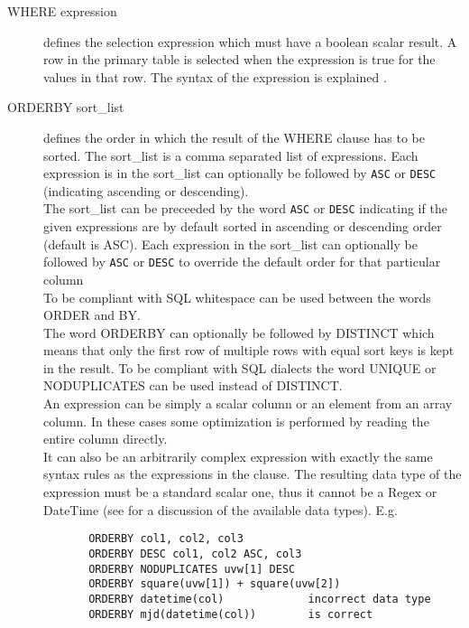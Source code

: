 \begin{description}
  \item[WHERE expression]
       defines the selection expression which must have a boolean
       scalar result. A row in the primary table
       is selected when the expression is true for the values in that row.
       The syntax of the expression is explained
       .
  \item[ \label{TAQL:ORDERBY}ORDERBY sort\_list]
       defines the order in which the result of the WHERE clause
       has to be sorted. The sort\_list is a comma separated list of
       expressions.
       Each expression is in the sort\_list can optionally be
       followed by \texttt{ASC} or \texttt{DESC}
       (indicating ascending or descending).
       \\The sort\_list can be preceeded by the word \texttt{ASC} or
       \texttt{DESC} indicating if the given expressions are by
       default sorted in ascending or descending order (default is ASC).
       Each expression in the sort\_list can optionally be
       followed by \texttt{ASC} or \texttt{DESC} to override the
       default order for that particular column
       \\To be compliant with SQL whitespace can be used between the
       words ORDER and BY.
       \\The word ORDERBY can optionally be followed by DISTINCT
       which means that only the first row of multiple rows with
       equal sort keys is kept in the result. To be compliant with
       SQL dialects the word UNIQUE or NODUPLICATES can be used
       instead of DISTINCT.
       \\An expression can be simply a scalar column or an element from
       an array column. In these cases some optimization is performed
       by reading the entire column directly.
       \\It can also be an arbitrarily complex expression
       with exactly the same syntax rules as the expressions in the
        clause.
       The resulting data type of the expression must
       be a standard scalar one, thus it cannot be a Regex or
       DateTime (see  for a discussion
       of the available data types).
       E.g.
       \begin{verbatim}
       ORDERBY col1, col2, col3
       ORDERBY DESC col1, col2 ASC, col3
       ORDERBY NODUPLICATES uvw[1] DESC
       ORDERBY square(uvw[1]) + square(uvw[2])
       ORDERBY datetime(col)             incorrect data type
       ORDERBY mjd(datetime(col))        is correct

\end{verbatim}
\end{description}

